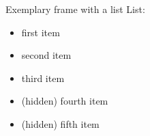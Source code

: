 \documentclass{beamer}
\begin{document}
\begin{frame}{Exemplary frame with a list}
  List:
  \begin{itemize}
    \item first item
    \item second item
    \item third item
    \pause
    \item (hidden) fourth item
    \item (hidden) fifth item
  \end{itemize}
\end{frame}
\end{document}
